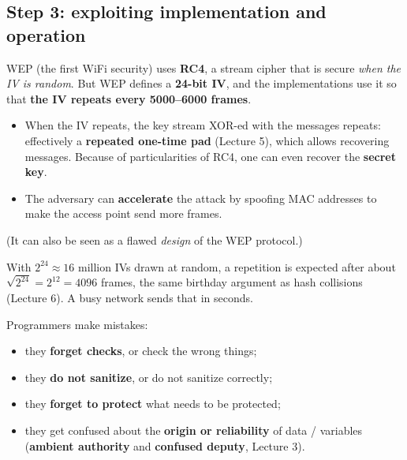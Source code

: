 \subsection{Step 3: exploiting implementation and operation}

\begin{exbox}[title={Bad operation decisions: WEP's use of RC4}]
WEP (the first WiFi security) uses \textbf{RC4}, a stream cipher that is secure \emph{when the IV is
random}. But WEP defines a \textbf{24-bit IV}, and the implementations use it so that \textbf{the
IV repeats every 5000--6000 frames}.
\begin{itemize}
  \item When the IV repeats, the key stream XOR-ed with the messages repeats: effectively a
        \textbf{repeated one-time pad} (Lecture 5), which allows recovering messages. Because of
        particularities of RC4, one can even recover the \textbf{secret key}.
  \item The adversary can \textbf{accelerate} the attack by spoofing MAC addresses to make the
        access point send more frames.
\end{itemize}
(It can also be seen as a flawed \emph{design} of the WEP protocol.)
\end{exbox}

\begin{rembox}[title={Why every 5000 frames? (the birthday paradox)}]
With $2^{24} \approx 16$ million IVs drawn at random, a repetition is expected after about
$\sqrt{2^{24}} = 2^{12} = 4096$ frames, the same birthday argument as hash collisions (Lecture 6).
A busy network sends that in seconds.
\end{rembox}

\begin{defnbox}[title={Implementation flaws: bugs, bugs and more bugs}]
Programmers make mistakes:
\begin{itemize}
  \item they \textbf{forget checks}, or check the wrong things;
  \item they \textbf{do not sanitize}, or do not sanitize correctly;
  \item they \textbf{forget to protect} what needs to be protected;
  \item they get confused about the \textbf{origin or reliability} of data / variables
        (\textbf{ambient authority} and \textbf{confused deputy}, Lecture 3).
\end{itemize}
\end{defnbox}

